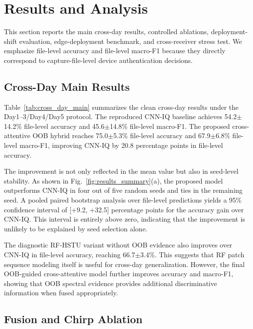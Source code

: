 \section{Results and Analysis}
\label{sec:results}

This section reports the main cross-day results, controlled ablations, deployment-shift evaluation, edge-deployment benchmark, and cross-receiver stress test. We emphasize file-level accuracy and file-level macro-F1 because they directly correspond to capture-file-level device authentication decisions.

\subsection{Cross-Day Main Results}

Table~\ref{tab:cross_day_main} summarizes the clean cross-day results under the Day1--3/Day4/Day5 protocol. The reproduced CNN-IQ baseline achieves 54.2$\pm$14.2\% file-level accuracy and 45.6$\pm$14.8\% file-level macro-F1. The proposed cross-attentive OOB hybrid reaches 75.0$\pm$5.3\% file-level accuracy and 67.9$\pm$6.8\% file-level macro-F1, improving CNN-IQ by 20.8 percentage points in file-level accuracy.



The improvement is not only reflected in the mean value but also in seed-level stability. As shown in Fig.~\ref{fig:results_summary}(a), the proposed model outperforms CNN-IQ in four out of five random seeds and ties in the remaining seed. A pooled paired bootstrap analysis over file-level predictions yields a 95\% confidence interval of [+9.2, +32.5] percentage points for the accuracy gain over CNN-IQ. This interval is entirely above zero, indicating that the improvement is unlikely to be explained by seed selection alone.

The diagnostic RF-HSTU variant without OOB evidence also improves over CNN-IQ in file-level accuracy, reaching 66.7$\pm$3.4\%. This suggests that RF patch sequence modeling itself is useful for cross-day generalization. However, the final OOB-guided cross-attentive model further improves accuracy and macro-F1, showing that OOB spectral evidence provides additional discriminative information when fused appropriately.

\subsection{Fusion and Chirp Ablation}

